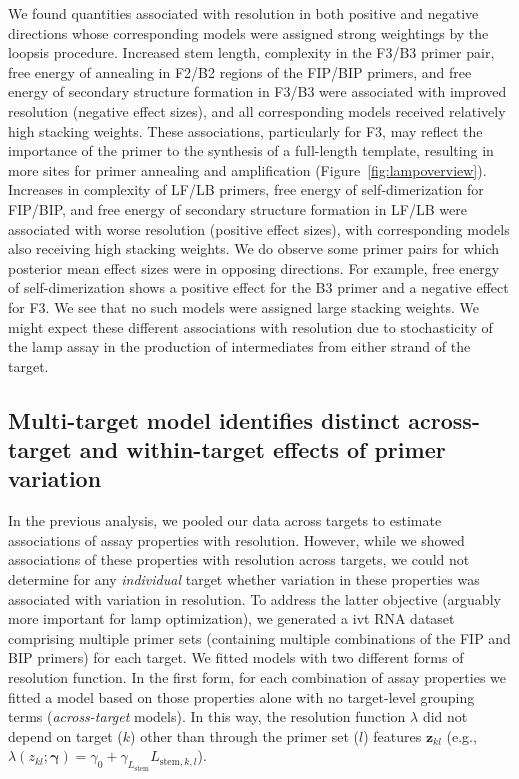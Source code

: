 \documentclass[../thesis.tex]{subfiles}
\begin{document}
We found quantities associated with resolution in both positive and negative directions whose corresponding models were assigned strong weightings by the \gls{loopsis} procedure. Increased stem length, complexity in the F3/B3 primer pair, free energy of annealing in F2/B2 regions of the FIP/BIP primers, and free energy of secondary structure formation in F3/B3 were associated with improved resolution (negative effect sizes), and all corresponding models received relatively high stacking weights. These associations, particularly for F3, may reflect the importance of the primer to the synthesis of a full-length template, resulting in more sites for primer annealing and amplification (Figure~\ref{fig:lampoverview}). Increases in complexity of LF/LB primers, free energy of self-dimerization for FIP/BIP, and free energy of secondary structure formation in LF/LB were associated with worse resolution (positive effect sizes), with corresponding models also receiving high stacking weights. We do observe some primer pairs for which posterior mean effect sizes were in opposing directions. For example, free energy of self-dimerization shows a positive effect for the B3 primer and a negative effect for F3. We see that no such models were assigned large stacking weights. We might expect these different associations with resolution due to stochasticity of the \gls{lamp} assay in the production of intermediates from either strand of the target.

\subsection{Multi-target model identifies distinct across-target and within-target effects of primer variation \label{sec:ivt_results}}
In the previous analysis, we pooled our data across targets to estimate associations of assay properties with resolution. However, while we showed associations of these properties with resolution across targets, we could not determine for any \emph{individual} target whether variation in these properties was associated with variation in resolution. To address the latter objective (arguably more important for \gls{lamp} optimization), we generated a \gls{ivt} RNA dataset comprising multiple primer sets (containing multiple combinations of the FIP and BIP primers) for each target. We fitted models with two different forms of resolution function. In the first form, for each combination of assay properties we fitted a model based on those properties alone with no target-level grouping terms (\emph{across-target} models). In this way, the resolution function $\lambda$ did not depend on target ($k$) other than through the primer set ($l$) features $\bm{z}_{kl}$ (e.g., $\lambda(z_{kl}; \bm{\gamma}) = \gamma_0 + \gamma_{L_{\text{stem}}} L_{\text{stem},k,l}$).
 
\end{document}
